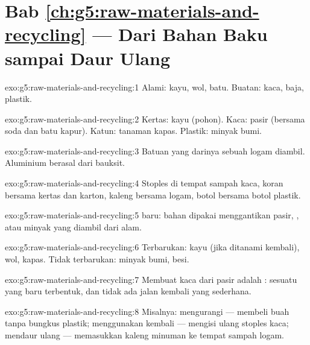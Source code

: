 \section*{Bab \ref{ch:g5:raw-materials-and-recycling} --- Dari Bahan Baku sampai Daur Ulang}

\begin{solution}{exo:g5:raw-materials-and-recycling:1}
Alami: kayu, wol, batu. Buatan: kaca, baja, plastik.
\end{solution}

\begin{solution}{exo:g5:raw-materials-and-recycling:2}
Kertas: kayu (pohon). Kaca: pasir (bersama soda dan batu kapur). Katun:
tanaman kapas. Plastik: minyak bumi.
\end{solution}

\begin{solution}{exo:g5:raw-materials-and-recycling:3}
Batuan yang darinya sebuah logam diambil. Aluminium berasal dari
bauksit.
\end{solution}

\begin{solution}{exo:g5:raw-materials-and-recycling:4}
Stoples di tempat sampah kaca, koran bersama kertas dan karton, kaleng
bersama logam, botol bersama botol plastik.
\end{solution}

\begin{solution}{exo:g5:raw-materials-and-recycling:5}
 baru: bahan  dipakai menggantikan pasir, ,
atau minyak yang diambil dari alam.
\end{solution}

\begin{solution}{exo:g5:raw-materials-and-recycling:6}
Terbarukan: kayu (jika ditanami kembali), wol, kapas. Tidak
terbarukan: minyak bumi,  besi.
\end{solution}

\begin{solution}{exo:g5:raw-materials-and-recycling:7}
Membuat kaca dari pasir adalah : sesuatu yang baru
terbentuk, dan tidak ada jalan kembali yang sederhana.
\end{solution}

\begin{solution}{exo:g5:raw-materials-and-recycling:8}
Misalnya: mengurangi --- membeli buah tanpa bungkus plastik; menggunakan
kembali --- mengisi ulang stoples kaca; mendaur ulang --- memasukkan
kaleng minuman ke tempat sampah logam.
\end{solution}

